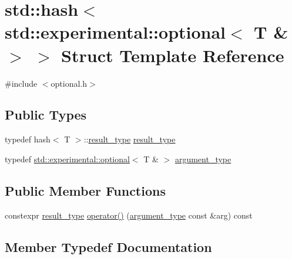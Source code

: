 \hypertarget{structstd_1_1hash_3_01std_1_1experimental_1_1optional_3_01_t_01_6_01_4_01_4}{}\section{std\+:\+:hash$<$ std\+:\+:experimental\+:\+:optional$<$ T \& $>$ $>$ Struct Template Reference}
\label{structstd_1_1hash_3_01std_1_1experimental_1_1optional_3_01_t_01_6_01_4_01_4}


{\ttfamily \#include $<$optional.\+h$>$}

\subsection*{Public Types}
\begin{DoxyCompactItemize}
\item 
typedef hash$<$ T $>$\+::\mbox{\hyperlink{structstd_1_1hash_3_01std_1_1experimental_1_1optional_3_01_t_01_6_01_4_01_4_acfb996ccc0604598b856ff0b73abf1a0}{result\+\_\+type}} \mbox{\hyperlink{structstd_1_1hash_3_01std_1_1experimental_1_1optional_3_01_t_01_6_01_4_01_4_acfb996ccc0604598b856ff0b73abf1a0}{result\+\_\+type}}
\item 
typedef \mbox{\hyperlink{classstd_1_1experimental_1_1optional}{std\+::experimental\+::optional}}$<$ T \& $>$ \mbox{\hyperlink{structstd_1_1hash_3_01std_1_1experimental_1_1optional_3_01_t_01_6_01_4_01_4_ab5e4cdb491b0c3833fa266cdf95a26f8}{argument\+\_\+type}}
\end{DoxyCompactItemize}
\subsection*{Public Member Functions}
\begin{DoxyCompactItemize}
\item 
constexpr \mbox{\hyperlink{structstd_1_1hash_3_01std_1_1experimental_1_1optional_3_01_t_01_6_01_4_01_4_acfb996ccc0604598b856ff0b73abf1a0}{result\+\_\+type}} \mbox{\hyperlink{structstd_1_1hash_3_01std_1_1experimental_1_1optional_3_01_t_01_6_01_4_01_4_a7d500e8beb4c7420f49f73ffd68e0fac}{operator()}} (\mbox{\hyperlink{structstd_1_1hash_3_01std_1_1experimental_1_1optional_3_01_t_01_6_01_4_01_4_ab5e4cdb491b0c3833fa266cdf95a26f8}{argument\+\_\+type}} const \&arg) const
\end{DoxyCompactItemize}


\subsection{Member Typedef Documentation}
\mbox{\label{structstd_1_1hash_3_01std_1_1experimental_1_1optional_3_01_t_01_6_01_4_01_4_ab5e4cdb491b0c3833fa266cdf95a26f8}} 
